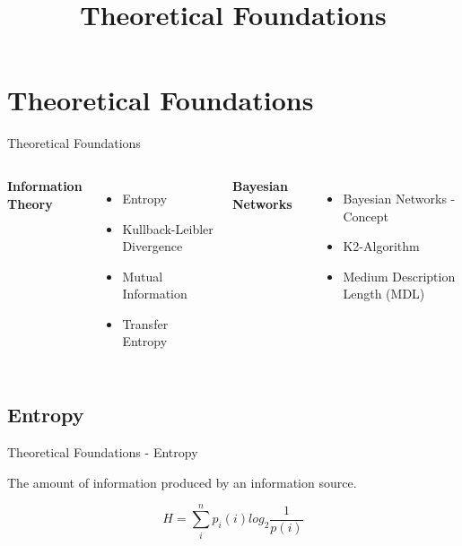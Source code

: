 \section{ Theoretical Foundations}

\title[Theoretical Foundations]{Theoretical Foundations}

\begin{frame}{{Theoretical Foundations}}
     \begin{columns}
            \textbf{Information Theory}
            \begin{itemize}
                \item Entropy
                \item Kullback-Leibler Divergence
                \item Mutual Information
                \item Transfer Entropy
            \end{itemize}

            \textbf{Bayesian Networks}
            \begin{itemize}
                \item Bayesian Networks - Concept
                \item K2-Algorithm
                \item Medium Description Length (MDL)
            \end{itemize}
	\end{columns}



\end{frame}

\subsection{Entropy}
\begin{frame}{Theoretical Foundations - Entropy}

	       
	        
	      

\begin{definition}
The amount of information produced by an information source.

\begin{equation}
\label{eq:shannon}
     H = \sum_{i}^{n} p_{i}(i)log_{2}\frac{1}{p(i)}
\end{equation}
\end{definition}

\end{frame}

